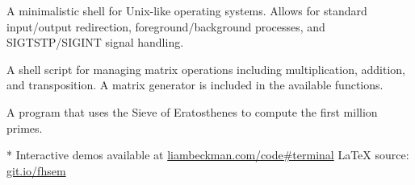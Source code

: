 \myBreak


A minimalistic shell for Unix-like operating systems. Allows for standard input/output redirection, foreground/background processes, and SIGTSTP/SIGINT signal handling.

\myBreak


A shell script for managing matrix operations including multiplication, addition, and transposition. A matrix generator is included in the available functions.

\myBreak


A program that uses the Sieve of Eratosthenes to compute the first million primes.

\myBreak

\vfill
* Interactive demos available at \textcolor{my-blue}{\href{https://liambeckman.com/code\#terminal}{liambeckman.com/code\#terminal}}
\hfill\textcolor{my-red}{\LaTeX{} source: \href{https://git.io/fhsem}{git.io/fhsem}}


